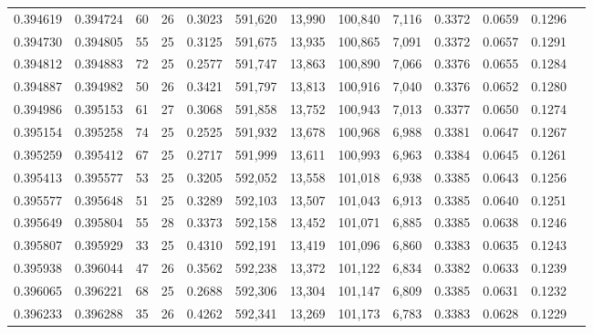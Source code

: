 \begin{tabular}{rrrrrrrrrrrrr}
0.394619 & 0.394724 &    60 &  26 &                                     0.3023 & 591,620 &  13,990 & 100,840 &   7,116 & 0.3372 & 0.0659 & 0.1296 \\
0.394730 & 0.394805 &    55 &  25 &                                     0.3125 & 591,675 &  13,935 & 100,865 &   7,091 & 0.3372 & 0.0657 & 0.1291 \\
0.394812 & 0.394883 &    72 &  25 &                                     0.2577 & 591,747 &  13,863 & 100,890 &   7,066 & 0.3376 & 0.0655 & 0.1284 \\
0.394887 & 0.394982 &    50 &  26 &                                     0.3421 & 591,797 &  13,813 & 100,916 &   7,040 & 0.3376 & 0.0652 & 0.1280 \\
0.394986 & 0.395153 &    61 &  27 &                                     0.3068 & 591,858 &  13,752 & 100,943 &   7,013 & 0.3377 & 0.0650 & 0.1274 \\
0.395154 & 0.395258 &    74 &  25 &                                     0.2525 & 591,932 &  13,678 & 100,968 &   6,988 & 0.3381 & 0.0647 & 0.1267 \\
0.395259 & 0.395412 &    67 &  25 &                                     0.2717 & 591,999 &  13,611 & 100,993 &   6,963 & 0.3384 & 0.0645 & 0.1261 \\
0.395413 & 0.395577 &    53 &  25 &                                     0.3205 & 592,052 &  13,558 & 101,018 &   6,938 & 0.3385 & 0.0643 & 0.1256 \\
0.395577 & 0.395648 &    51 &  25 &                                     0.3289 & 592,103 &  13,507 & 101,043 &   6,913 & 0.3385 & 0.0640 & 0.1251 \\
0.395649 & 0.395804 &    55 &  28 &                                     0.3373 & 592,158 &  13,452 & 101,071 &   6,885 & 0.3385 & 0.0638 & 0.1246 \\
0.395807 & 0.395929 &    33 &  25 &                                     0.4310 & 592,191 &  13,419 & 101,096 &   6,860 & 0.3383 & 0.0635 & 0.1243 \\
0.395938 & 0.396044 &    47 &  26 &                                     0.3562 & 592,238 &  13,372 & 101,122 &   6,834 & 0.3382 & 0.0633 & 0.1239 \\
0.396065 & 0.396221 &    68 &  25 &                                     0.2688 & 592,306 &  13,304 & 101,147 &   6,809 & 0.3385 & 0.0631 & 0.1232 \\
0.396233 & 0.396288 &    35 &  26 &                                     0.4262 & 592,341 &  13,269 & 101,173 &   6,783 & 0.3383 & 0.0628 & 0.1229 \\

\end{tabular}
